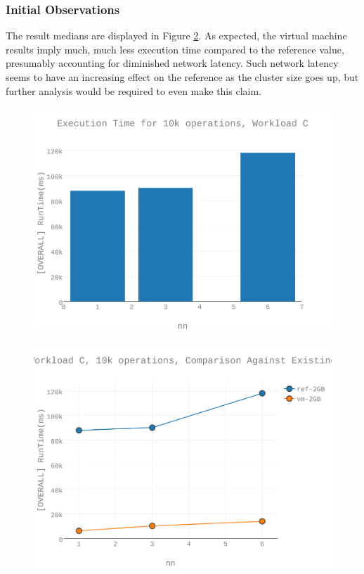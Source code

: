 \subsubsection{Initial Observations}
The result medians are displayed in Figure \ref{figures-wlc_fig5}.  As expected, the virtual machine results imply much, much less execution time compared to the reference value, presumably accounting for diminished network latency. Such network latency seems to have an increasing effect on the reference as the cluster size goes up, but further analysis would be required to even make this claim. \begin{figure}[h]
\includegraphics[width=5.5in]{Figures/figures-wlc_fig1.pdf}
\caption{}
\label{figures-wlc_fig1}
\end{figure}

\begin{figure}[h]
\includegraphics[width=5.5in]{Figures/figures-wlc_fig5.pdf}
\caption{}
\label{figures-wlc_fig5}
\end{figure}



